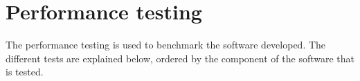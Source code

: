 









\section{Performance testing}
The performance testing is used to benchmark the software developed. The different tests are explained below, ordered by the component of the software that is tested. \\[0.5cm]

